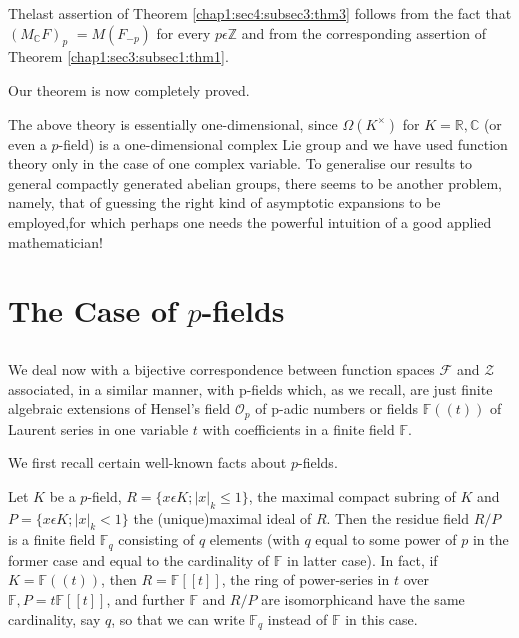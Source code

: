  The\pageoriginale last assertion of Theorem \ref{chap1:sec4:subsec3:thm3}
 follows from the fact that 
 $(M_{\mathbb{C}}F)_{p}$ $=M{(F_{-p})}$ for every $p\epsilon \mathbb{Z}$ and
   from the corresponding assertion of Theorem
   \ref{chap1:sec3:subsec1:thm1}. 

 Our theorem is now completely proved.

\begin{Remark*}
  The above theory is essentially one-dimensional, since\break 
  $\Omega(K^\times)$ for $K=\mathbb{R}, \mathbb{C}$ (or even a $p$-field) is
  a one-dimensional complex Lie group and we have used function theory
  only in the case of one complex variable. To generalise our results to
  general compactly generated abelian groups, there seems to be another
  problem, namely, that of guessing the right kind of asymptotic
  expansions to be employed,for which perhaps one needs the powerful
  intuition of a good applied mathematician!
\end{Remark*}

\section{The Case of $p$-fields}\label{chap1:sec5} 

\subsection{}\label{chap1:sec5:subsec1}  

We deal now with a bijective correspondence between function
spaces $\mathscr{F}$ and $\mathscr{Z}$ associated, in a similar
manner, with p-fields which, as we recall, are just finite algebraic
extensions of Hensel's field $\mathscr{O}_{p}$ of p-adic numbers or
fields $\mathbb{F}((t))$ of Laurent series in one variable $t$ with
coefficients in a finite field $\mathbb{F}$.

 We first recall certain well-known facts about $p$-fields. 

 Let $K$ be a $p$-field, $R=\{x \epsilon K;|x|_{k}\le 1 \}$, the maximal
 compact subring of $K$ and $P=\{x\epsilon K;|x|_{k}< 1\}$ the
 (unique)maximal ideal of $R$. Then the residue field $R/P$ is a
 finite field $\mathbb{F}_{q}$ consisting of $q$ elements (with $q$
 equal to some power of $p$ in the former case and equal to the
 cardinality of $\mathbb{F}$ in latter case). In fact, if
 $K=\mathbb{F}((t))$, then $R=\mathbb{F}[[t]]$, the ring of
 power-series in $t$ over $\mathbb{F},P=t \mathbb{F}[[t]]$, and
 further $\mathbb{F}$ and $R/P$ are isomorphic\pageoriginale and have the same
 cardinality, say $q$, so that we can write $\mathbb{F}_{q}$ instead
 of $\mathbb{F}$ in this case. 

